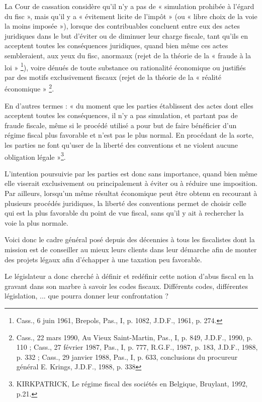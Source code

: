 \documentclass[12pt]{report}
\begin{document}
La Cour de cassation considère qu’il n’y a pas de « simulation prohibée à l’égard du fisc », mais qu’il y a « évitement licite de l’impôt » (ou « libre choix de la voie la moins imposée »), lorsque des contribuables concluent entre eux des actes juridiques dans le but d’éviter ou de diminuer leur charge fiscale, tant qu’ils en acceptent toutes les conséquences juridiques, quand bien même ces actes sembleraient, aux yeux du fisc, anormaux (rejet de la théorie de la « fraude à la loi » \footnote{Cass., 6 juin 1961, Brepols, Pas., I, p. 1082, J.D.F., 1961, p. 274.}), voire dénués de toute substance ou rationalité économique ou justifiés par des motifs exclusivement fiscaux (rejet de la théorie de la « réalité économique » \footnote{Cass., 22 mars 1990, Au Vieux Saint-Martin, Pas., I, p. 849, J.D.F., 1990, p. 110 ; Cass., 27 février 1987, Pas., I, p. 777, R.G.F., 1987, p. 183, J.D.F., 1988, p. 332 ; Cass., 29 janvier 1988, Pas., I, p. 633, conclusions du procureur général E. Krings, J.D.F., 1988, p. 338}.

En d’autres termes : « du moment que les parties établissent des actes dont elles acceptent toutes les conséquences, il n’y a pas simulation, et partant pas de fraude fiscale, même si le procédé utilisé a pour but de faire bénéficier d’un régime fiscal plus favorable et n’est pas le plus  normal. En procédant de la sorte, les parties ne font qu’user de la liberté des conventions et ne violent aucune obligation légale »\footnote{KIRKPATRICK, Le régime fiscal des sociétés en Belgique, Bruylant, 1992, p.21.}.

L’intention poursuivie par les parties est donc sans importance, quand bien même elle viserait exclusivement ou principalement à éviter ou à réduire une imposition. Par ailleurs, lorsqu’un même résultat économique peut être obtenu en recourant à plusieurs procédés juridiques, la liberté des conventions permet de choisir celle qui est la plus favorable du point de vue fiscal, sans qu’il y ait à rechercher la voie la plus normale.

Voici donc le cadre général posé depuis des décennies à tous les fiscalistes dont la mission est de conseiller au mieux leurs clients dans leur démarche afin de monter des projets légaux afin d'échapper à une taxation peu favorable.

Le législateur a donc cherché à définir et redéfinir cette notion d'abus fiscal en la gravant dans son marbre à savoir les codes fiscaux. Différents codes, différentes législation, ... que pourra donner leur confrontation ?
\end{document}
